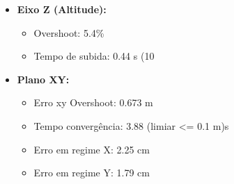 \begin{itemize}
  \item \textbf{Eixo Z (Altitude):}
  \begin{itemize}
    \item Overshoot: 5.4\%
    \item Tempo de subida: 0.44 s (10%
  \end{itemize}
  \item \textbf{Plano XY:}
  \begin{itemize}
    \item Erro xy Overshoot: 0.673 m
    \item Tempo convergência: 3.88 (limiar <= 0.1 m)s
    \item Erro em regime X: 2.25 cm
    \item Erro em regime Y: 1.79 cm
  \end{itemize}
\end{itemize}
